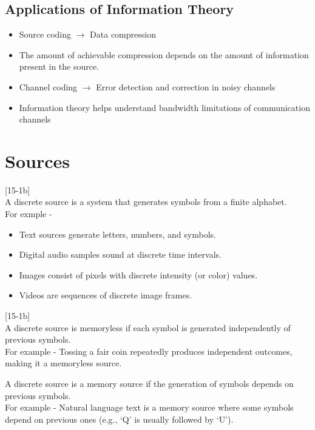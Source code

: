 \documentclass[11pt,a4paper]{book}
\newenvironment{definitionbox}[1][Definition]{
    \begin{tcolorbox}[
        enhanced,
        breakable,
        colback=primaryblue!10,
        colframe=primaryblue!150,
        title=#1,
        fonttitle=\bfseries,
        sharp corners,
        boxrule=0.8pt,
        left=8pt,
        right=8pt,
        top=6pt,
        bottom=6pt
    ]
}{
    \end{tcolorbox}
}
\begin{document}
\subsection{Applications of Information Theory}

\begin{itemize}
    \item Source coding $\rightarrow$ Data compression
    \item The amount of achievable compression depends on the amount of information present in the source.
    \item Channel coding $\rightarrow$ Error detection and correction in noisy channels
    \item Information theory helps understand bandwidth limitations of communication channels
\end{itemize}


\section{Sources}

\begin{definitionbox}[Discrete Source]
[15-1b]\\
    A discrete source is a system that generates symbols from a finite alphabet.\\
    For exmple - 
\begin{itemize}
    \item Text sources generate letters, numbers, and symbols.
    \item Digital audio samples sound at discrete time intervals.
    \item Images consist of pixels with discrete intensity (or color) values.
    \item Videos are sequences of discrete image frames.
\end{itemize}
\end{definitionbox}

\begin{definitionbox}[Memoryless Source]
[15-1b]\\
    A discrete source is memoryless if each symbol is generated independently of previous symbols.\\
    For example - Tossing a fair coin repeatedly produces independent outcomes, making it a memoryless source.
\end{definitionbox}

\begin{definitionbox}[Memory Source]
    A discrete source is a memory source if the generation of symbols depends on previous symbols.\\
    For example - Natural language text is a memory source where some symbols depend on previous ones (e.g., `Q' is usually followed by `U').
\end{definitionbox}
\end{document}
